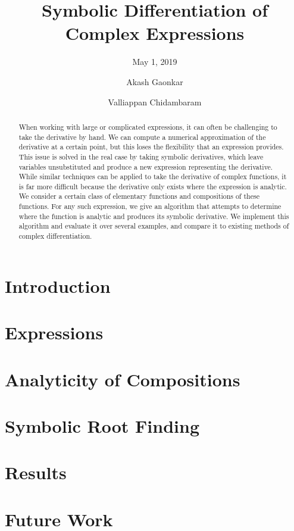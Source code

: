 \documentclass[sigplan]{acmart}
\title{Symbolic Differentiation of Complex Expressions}
\subtitle{May 1, 2019}
\author{Akash Gaonkar}
\affiliation{Undergraduate Student, \institution{University of Colorado at Boulder}}
\author{Valliappan Chidambaram}
\affiliation{Undergraduate Student, \institution{University of Colorado at Boulder}}
\begin{document}
  \begin{abstract}
		When working with large or complicated expressions, it can often be challenging to take the derivative by hand. We can compute a numerical approximation of the derivative at a certain point, but this loses the flexibility that an expression provides. This issue is solved in the real case by taking symbolic derivatives, which leave variables unsubstituted and produce a new expression representing the derivative. While similar techniques can be applied to take the derivative of complex functions, it is far more difficult because the derivative only exists where the expression is analytic. We consider a certain class of elementary functions and compositions of these functions. For any such expression, we give an algorithm that attempts to determine where the function is analytic and produces its symbolic derivative. We implement this algorithm and evaluate it over several examples, and compare it to existing methods of complex differentiation.
  \end{abstract}

  \maketitle

  \section{Introduction}
  \label{sec:introduction}
  

  \section{Expressions}
  \label{sec:expressions}
  

  \section{Analyticity of Compositions}
  \label{sec:analyticity}
  

  \section{Symbolic Root Finding}
  \label{sec:rootfinding}
  

  \section{Results}
  \label{sec:results}
  

  \section{Future Work}
  \label{sec:futurework}
  
\end{document}
